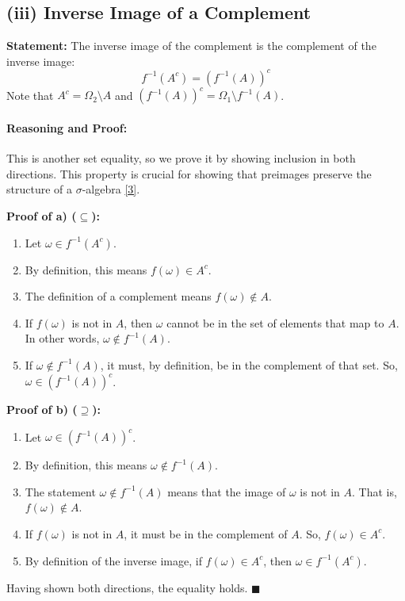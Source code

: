 \documentclass[11pt,a4paper]{article}
\newcommand{\myref}[2]{\hyperlink{#1}{\color{red!80!black}[#2]}}
\begin{document}
\subsection*{(iii) Inverse Image of a Complement}

\textbf{Statement:} The inverse image of the complement is the complement of the inverse image:
\[ f^{-1}(A^c) = (f^{-1}(A))^c \]
Note that $A^c = \Omega_2 \setminus A$ and $(f^{-1}(A))^c = \Omega_1 \setminus f^{-1}(A)$.

\paragraph{Reasoning and Proof:}
This is another set equality, so we prove it by showing inclusion in both directions. This property is crucial for showing that preimages preserve the structure of a $\sigma$-algebra \myref{ref:sigma_algebra}{3}.

\textbf{Proof of a) ($\subseteq$):}
\begin{enumerate}
    \item Let $\omega \in f^{-1}(A^c)$.
    \item By definition, this means $f(\omega) \in A^c$.
    \item The definition of a complement means $f(\omega) \notin A$.
    \item If $f(\omega)$ is not in $A$, then $\omega$ cannot be in the set of elements that map to $A$. In other words, $\omega \notin f^{-1}(A)$.
    \item If $\omega \notin f^{-1}(A)$, it must, by definition, be in the complement of that set. So, $\omega \in (f^{-1}(A))^c$.
\end{enumerate}

\textbf{Proof of b) ($\supseteq$):}
\begin{enumerate}
    \item Let $\omega \in (f^{-1}(A))^c$.
    \item By definition, this means $\omega \notin f^{-1}(A)$.
    \item The statement $\omega \notin f^{-1}(A)$ means that the image of $\omega$ is not in $A$. That is, $f(\omega) \notin A$.
    \item If $f(\omega)$ is not in $A$, it must be in the complement of $A$. So, $f(\omega) \in A^c$.
    \item By definition of the inverse image, if $f(\omega) \in A^c$, then $\omega \in f^{-1}(A^c)$.
\end{enumerate}
Having shown both directions, the equality holds.
\hfill $\blacksquare$
\end{document}
